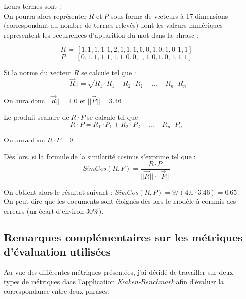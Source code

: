 Leurs termes sont : \\

On pourra alors représenter $R$ et $P$ sous forme de vecteurs à 17 dimensions (correspondant au nombre de termes relevés) dont les valeurs numériques représentent les occurrences d'apparition du mot dans la phrase :

$$R\,=\,[1,1,1,1,1,2,1,1,1,0,0,1,0,1,0,1,1]$$
$$P\,=\,[0,1,1,1,1,1,1,0,0,1,1,0,1,0,1,1,1]$$

Si la norme du vecteur $R$ se calcule tel que : $$||\overrightarrow{R}|| = \sqrt{R_1 \cdot R_1 + R_2 \cdot R_2 + \ldots + R_n \cdot R_n}$$

On aura donc $||\overrightarrow{R}|| = 4.0 $ et $||\overrightarrow{P}|| = 3.46 $

Le produit scalaire de $R \cdot P$ se calcule tel que : $$R \cdot P = R_1 \cdot P_1 + R_2 \cdot P_2 + \ldots + R_n \cdot P_n$$

On aura donc $R \cdot P = 9$

Dès lors, si la formule de la similarité cosinus s'exprime tel que : $$SimCos(R,P) = \frac{R \cdot P}{||\overrightarrow{R}|| \cdot ||\overrightarrow{P}||}$$

On obtient alors le résultat suivant : $SimCos(R,P) = 9 / (4.0 \cdot 3.46) = 0.65$ \\ On peut dire que les documents sont éloignés dès lors le modèle à commis des erreurs (un écart d'environ 30\%).

\subsection{Remarques complémentaires sur les métriques d'évaluation utilisées}

Au vue des différentes métriques présentées, j'ai décidé de travailler sur deux types de métriques dans l'application \textit{Kraken-Benchmark} afin d'évaluer la correspondance entre deux phrases.

